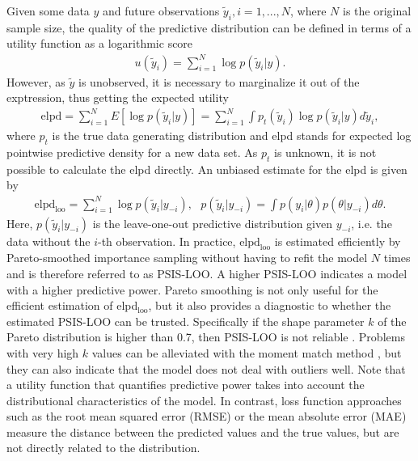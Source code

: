 Given some data $y$ and future observations $\tilde y_i, i = 1, ..., N$, where $N$ is the original sample size, the quality of the predictive distribution can be defined in terms of a utility function as a logarithmic score \citep{piironen_comparison_2017}
\begin{gather*}
    u(\tilde y_i) = \displaystyle \sum_{i = 1}^N\log p(\tilde y_i|y).
\end{gather*}
However, as $\tilde y$ is unobserved, it is necessary to marginalize it out of the exptression, thus getting the expected utility
\begin{gather*}
    \text{elpd} =
    \displaystyle \sum_{i = 1}^N E[\log p(\tilde y_i| y)] =
    \displaystyle \sum_{i = 1}^N \int p_t(\tilde y_i) \log p(\tilde y_i| y) d \tilde y_i,
\end{gather*}
where $p_t$ is the true data generating distribution and elpd stands for expected log pointwise predictive density for a new data set.
As $p_t$ is unknown, it is not possible to calculate the elpd directly.
An unbiased estimate for the elpd is given by
\begin{gather}
    \text{elpd}_{\text{loo}} =
    \displaystyle \sum_{i = 1}^N \log p(\tilde y_i| y_{-i}),
    ~~~ p(\tilde y_i| y_{-i}) = \displaystyle \int p(y_i | \theta)p(\theta|y_{-i})d\theta.
\end{gather}
Here, $p(\tilde y_i| y_{-i})$ is the leave-one-out predictive distribution given $y_{-i}$, i.e. the data without the $i$-th observation.
In practice, $\text{elpd}_{\text{loo}}$ is estimated efficiently by Pareto-smoothed importance sampling without having to refit the model $N$ times and is therefore referred to as PSIS-LOO.
A higher PSIS-LOO indicates a model with a higher predictive power.
Pareto smoothing is not only useful for the efficient estimation of elpd$_{\text{loo}}$, but it also provides a diagnostic to whether the estimated PSIS-LOO can be trusted.
Specifically if the shape parameter $k$ of the Pareto distribution is higher than 0.7, then PSIS-LOO is not reliable \citep{vehtari_practical_2017}.
Problems with very high $k$ values can be alleviated with the moment match method \cite{paananen_implicitly_2021}, but they can also indicate that the model does not deal with outliers well.
Note that a utility function that quantifies predictive power takes into account the distributional characteristics of the model.
In contrast, loss function approaches such as the root mean squared error (RMSE) or the mean absolute error (MAE) measure the distance between the predicted values and the true values, but are not directly related to the distribution.

